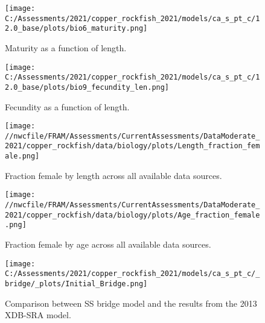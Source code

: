 \documentclass[11pt,
  english,
  a4paper,
]{article}
\begin{document}
\begin{figure}
\centering
\texttt{[image: C:/Assessments/2021/copper\_rockfish\_2021/models/ca\_s\_pt\_c/12.0\_base/plots/bio6\_maturity.png]}
\caption{Maturity as a function of length.\label{fig:maturity}}
\end{figure}

\tagmcend\tagstructend


\begin{figure}
\centering
\texttt{[image: C:/Assessments/2021/copper\_rockfish\_2021/models/ca\_s\_pt\_c/12.0\_base/plots/bio9\_fecundity\_len.png]}
\caption{Fecundity as a function of length.\label{fig:fecundity}}
\end{figure}

\tagmcend\tagstructend


\begin{figure}
\centering
\texttt{[image: //nwcfile/FRAM/Assessments/CurrentAssessments/DataModerate\_2021/copper\_rockfish/data/biology/plots/Length\_fraction\_female.png]}
\caption{Fraction female by length across all available data sources.\label{fig:len-sex-ratio}}
\end{figure}

\tagmcend\tagstructend


\begin{figure}
\centering
\texttt{[image: //nwcfile/FRAM/Assessments/CurrentAssessments/DataModerate\_2021/copper\_rockfish/data/biology/plots/Age\_fraction\_female.png]}
\caption{Fraction female by age across all available data sources.\label{fig:age-sex-ratio}}
\end{figure}

\tagmcend\tagstructend


\begin{figure}
\centering
\texttt{[image: C:/Assessments/2021/copper\_rockfish\_2021/models/ca\_s\_pt\_c/\_bridge/\_plots/Initial\_Bridge.png]}
\caption{Comparison between SS bridge model and the results from the 2013 XDB-SRA model.\label{fig:bridge-1}}
\end{figure}
\end{document}
